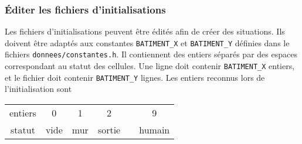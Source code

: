 \subsubsection{Éditer les fichiers d'initialisations}
Les fichiers d'initialisations peuvent être édités afin de créer des situations. Ils doivent être adaptés aux constantes \texttt{BATIMENT\_X} et \texttt{BATIMENT\_Y} définies dans le fichiers \texttt{donnees/constantes.h}. Il contiennent des entiers séparés par des espaces correspondant au statut des cellules. Une ligne doit contenir \texttt{BATIMENT\_X} entiers, et le fichier doit contenir \texttt{BATIMENT\_Y} lignes. Les entiers reconnus lors de l'initialisation sont

\begin{center}
\begin{tabular}{cccccc}
entiers & 0 & 1 & 2 &  & 9 \\
statut & vide & mur & sortie &  & humain \\
\end{tabular}
\end{center}
%











